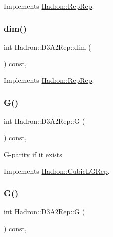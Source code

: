 Implements \mbox{\hyperlink{structHadron_1_1RepRep_a92c8802e5ed7afd7da43ccfd5b7cd92b}{Hadron\+::\+Rep\+Rep}}.

\mbox{\label{structHadron_1_1D3A2Rep_a38d0163b1fb9994be68c43d2bfc90ce4}} 
\subsubsection{\texorpdfstring{dim()}{dim()}\hspace{0.1cm}{\footnotesize\ttfamily [3/3]}}
{\footnotesize\ttfamily int Hadron\+::\+D3\+A2\+Rep\+::dim (\begin{DoxyParamCaption}{ }\end{DoxyParamCaption}) const\hspace{0.3cm}{\ttfamily [inline]}, {\ttfamily [virtual]}}



Implements \mbox{\hyperlink{structHadron_1_1RepRep_a92c8802e5ed7afd7da43ccfd5b7cd92b}{Hadron\+::\+Rep\+Rep}}.

\mbox{\label{structHadron_1_1D3A2Rep_a2d35804ba790c296d4f0d984adc7e7c9}} 
\subsubsection{\texorpdfstring{G()}{G()}\hspace{0.1cm}{\footnotesize\ttfamily [1/2]}}
{\footnotesize\ttfamily int Hadron\+::\+D3\+A2\+Rep\+::G (\begin{DoxyParamCaption}{ }\end{DoxyParamCaption}) const\hspace{0.3cm}{\ttfamily [inline]}, {\ttfamily [virtual]}}

G-\/parity if it exists 

Implements \mbox{\hyperlink{structHadron_1_1CubicLGRep_ace26f7b2d55e3a668a14cb9026da5231}{Hadron\+::\+Cubic\+L\+G\+Rep}}.

\mbox{\label{structHadron_1_1D3A2Rep_a2d35804ba790c296d4f0d984adc7e7c9}} 
\subsubsection{\texorpdfstring{G()}{G()}\hspace{0.1cm}{\footnotesize\ttfamily [2/2]}}
{\footnotesize\ttfamily int Hadron\+::\+D3\+A2\+Rep\+::G (\begin{DoxyParamCaption}{ }\end{DoxyParamCaption}) const\hspace{0.3cm}{\ttfamily [inline]}, {\ttfamily [virtual]}}

